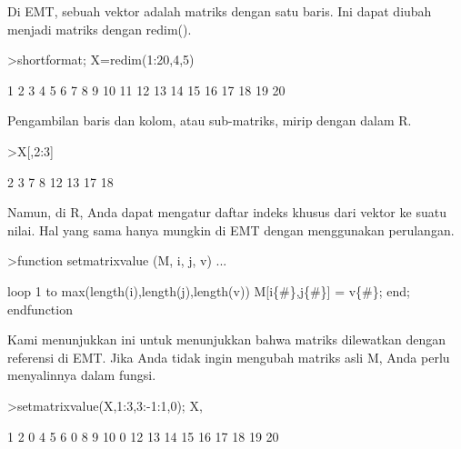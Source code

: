 \documentclass[a4paper,10pt]{article}
\begin{document}
\begin{eulernotebook}
\begin{eulercomment}
\begin{eulercomment}
\begin{eulercomment}
\begin{eulercomment}
\begin{eulercomment}
Di EMT, sebuah vektor adalah matriks dengan satu baris. Ini dapat
diubah menjadi matriks dengan redim().
\end{eulercomment}
\begin{eulerprompt}
>shortformat; X=redim(1:20,4,5)
\end{eulerprompt}
\begin{euleroutput}
          1         2         3         4         5 
          6         7         8         9        10 
         11        12        13        14        15 
         16        17        18        19        20 
\end{euleroutput}
\begin{eulercomment}
Pengambilan baris dan kolom, atau sub-matriks, mirip dengan dalam R.
\end{eulercomment}
\begin{eulerprompt}
>X[,2:3]
\end{eulerprompt}
\begin{euleroutput}
          2         3 
          7         8 
         12        13 
         17        18 
\end{euleroutput}
\begin{eulercomment}
Namun, di R, Anda dapat mengatur daftar indeks khusus dari vektor ke
suatu nilai. Hal yang sama hanya mungkin di EMT dengan menggunakan
perulangan.
\end{eulercomment}
\begin{eulerprompt}
>function setmatrixvalue (M, i, j, v) ...
\end{eulerprompt}
\begin{eulerudf}
  loop 1 to max(length(i),length(j),length(v))
     M[i\{#\},j\{#\}] = v\{#\};
  end;
  endfunction
\end{eulerudf}
\begin{eulercomment}
Kami menunjukkan ini untuk menunjukkan bahwa matriks dilewatkan dengan
referensi di EMT. Jika Anda tidak ingin mengubah matriks asli M, Anda
perlu menyalinnya dalam fungsi.
\end{eulercomment}
\begin{eulerprompt}
>setmatrixvalue(X,1:3,3:-1:1,0); X,
\end{eulerprompt}
\begin{euleroutput}
          1         2         0         4         5 
          6         0         8         9        10 
          0        12        13        14        15 
         16        17        18        19        20 
\end{euleroutput}
\begin{eulercomment}

\end{eulercomment}
\end{eulercomment}
\end{eulercomment}
\end{eulercomment}
\end{eulercomment}
\end{eulernotebook}
\end{document}
